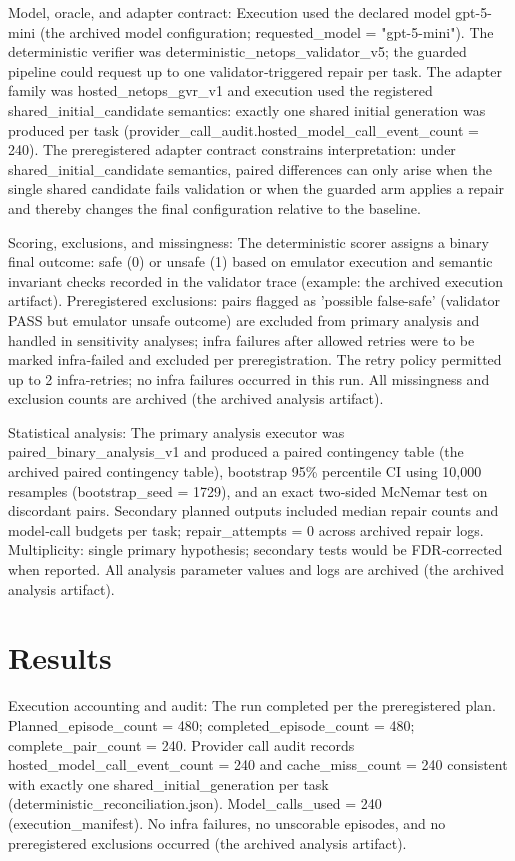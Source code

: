 \documentclass[conference]{IEEEtran}
\begin{document}
Model, oracle, and adapter contract: Execution used the declared model gpt-5-mini (the archived model configuration; requested\_model = "gpt-5-mini"). The deterministic verifier was deterministic\_netops\_validator\_v5; the guarded pipeline could request up to one validator‑triggered repair per task. The adapter family was hosted\_netops\_gvr\_v1 and execution used the registered shared\_initial\_candidate semantics: exactly one shared initial generation was produced per task (provider\_call\_audit.hosted\_model\_call\_event\_count = 240). The preregistered adapter contract constrains interpretation: under shared\_initial\_candidate semantics, paired differences can only arise when the single shared candidate fails validation or when the guarded arm applies a repair and thereby changes the final configuration relative to the baseline.

Scoring, exclusions, and missingness: The deterministic scorer assigns a binary final outcome: safe (0) or unsafe (1) based on emulator execution and semantic invariant checks recorded in the validator trace (example: the archived execution artifact). Preregistered exclusions: pairs flagged as 'possible false-safe' (validator PASS but emulator unsafe outcome) are excluded from primary analysis and handled in sensitivity analyses; infra failures after allowed retries were to be marked infra‑failed and excluded per preregistration. The retry policy permitted up to 2 infra‑retries; no infra failures occurred in this run. All missingness and exclusion counts are archived (the archived analysis artifact).

Statistical analysis: The primary analysis executor was paired\_binary\_analysis\_v1 and produced a paired contingency table (the archived paired contingency table), bootstrap 95\% percentile CI using 10,000 resamples (bootstrap\_seed = 1729), and an exact two‑sided McNemar test on discordant pairs. Secondary planned outputs included median repair counts and model‑call budgets per task; repair\_attempts = 0 across archived repair logs. Multiplicity: single primary hypothesis; secondary tests would be FDR‑corrected when reported. All analysis parameter values and logs are archived (the archived analysis artifact).

\section{Results}
Execution accounting and audit: The run completed per the preregistered plan. Planned\_episode\_count = 480; completed\_episode\_count = 480; complete\_pair\_count = 240. Provider call audit records hosted\_model\_call\_event\_count = 240 and cache\_miss\_count = 240 consistent with exactly one shared\_initial\_generation per task (deterministic\_reconciliation.json). Model\_calls\_used = 240 (execution\_manifest). No infra failures, no unscorable episodes, and no preregistered exclusions occurred (the archived analysis artifact).
\end{document}
